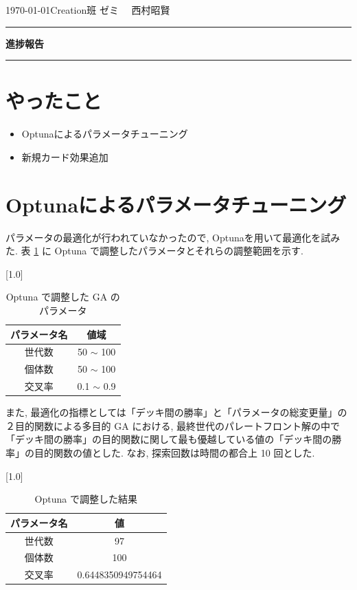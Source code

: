 \documentclass{jarticle}     %
\begin{document}
  \noindent
  \hspace{1em}

  \today Creation班 ゼミ
  \hfill
  \ \  西村昭賢 

  \vspace{2mm}
  \hrule
  \begin{center}
  {\Large \bf 進捗報告}
  \end{center}
  \hrule
  \vspace{3mm}


\section{やったこと}
\begin{itemize}
  \item Optunaによるパラメータチューニング
  \item 新規カード効果追加
\end{itemize}

\section{Optunaによるパラメータチューニング}
パラメータの最適化が行われていなかったので, Optunaを用いて最適化を試みた. 
表 \ref{table:gaparam} に Optuna で調整したパラメータとそれらの調整範囲を示す.


\begin{table}[ht]
  \centering
  \caption{Optuna で調整した GA のパラメータ}
  \vspace{-0.3cm}
  \label{table:gaparam}
  \scalebox{1.0}[1.0]{
    \begin{tabular}{|c|c|}
      \hline
      パラメータ名 & 値域 \\ \hline \hline
      世代数 & 50 $\sim$ 100 \\ \hline     
      個体数 & 50 $\sim$ 100    \\ \hline
      交叉率 & 0.1 $\sim$ 0.9 \\ \hline
      \end{tabular}
  }
  \end{table}
また, 最適化の指標としては「デッキ間の勝率」と「パラメータの総変更量」の２目的関数による多目的 GA における, 最終世代のパレートフロント解の中で「デッキ間の勝率」の目的関数に関して最も優越している値の「デッキ間の勝率」の目的関数の値とした.
なお, 探索回数は時間の都合上 10 回とした.
\par


\begin{table}[ht]
  \centering
  \caption{Optuna で調整した結果}
  \vspace{-0.3cm}
  \label{table:optunaanswer}
  \scalebox{1.0}[1.0]{
    \begin{tabular}{|c|c|}
      \hline
      パラメータ名 & 値 \\ \hline \hline
      世代数 &  97\\ \hline     
      個体数 & 100 \\ \hline
      交叉率 & 0.6448350949754464 \\ \hline
      \end{tabular}
  }
    \end{table}
\end{document}
